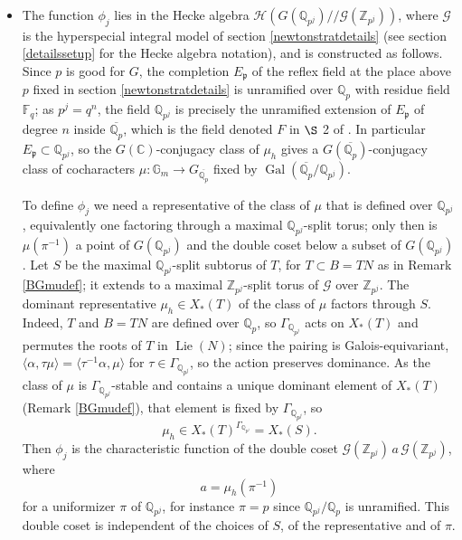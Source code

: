 \documentclass[11pt,a4paper]{article}
\theoremstyle{definition}
\theoremstyle{plain}
\theoremstyle{remark}
\theoremstyle{plain}
\DeclareMathOperator{\Lie}{Lie}
\DeclareMathOperator{\Gal}{Gal}
\begin{document}
\begin{itemize}
    \item The function $\phi_j$ lies in the Hecke algebra $\mathcal{H}(G(\mathbb{Q}_{p^j})//\mathcal{G}(\mathbb{Z}_{p^j}))$, where $\mathcal{G}$ is the hyperspecial integral model of section \ref{newtonstratdetails} (see section \ref{detailssetup} for the Hecke algebra notation), and is constructed as follows. Since $p$ is good for $G$, the completion $E_{\mathfrak{p}}$ of the reflex field at the place above $p$ fixed in section \ref{newtonstratdetails} is unramified over $\mathbb{Q}_p$ with residue field $\mathbb{F}_q$; as $p^j = q^n$, the field $\mathbb{Q}_{p^j}$ is precisely the unramified extension of $E_{\mathfrak{p}}$ of degree $n$ inside $\overline{\mathbb{Q}_p}$, which is the field denoted $F$ in $\S$ 2 of \cite{MR1044820}. In particular $E_{\mathfrak{p}} \subset \mathbb{Q}_{p^j}$, so the $G(\mathbb{C})$-conjugacy class of $\mu_h$ gives a $G(\overline{\mathbb{Q}_p})$-conjugacy class of cocharacters $\mu : \mathbb{G}_m \xrightarrow[]{} G_{\overline{\mathbb{Q}_p}}$ fixed by $\Gal(\overline{\mathbb{Q}_p}/\mathbb{Q}_{p^j})$.

    To define $\phi_j$ we need a representative of the class of $\mu$ that is defined over
    $\mathbb{Q}_{p^j}$, equivalently one factoring through a maximal $\mathbb{Q}_{p^j}$-split
    torus; only then is $\mu(\pi^{-1})$ a point of $G(\mathbb{Q}_{p^j})$ and the double coset
    below a subset of $G(\mathbb{Q}_{p^j})$. Let $S$ be the maximal $\mathbb{Q}_{p^j}$-split subtorus of $T$, for $T \subset B = TN$ as in Remark \ref{BGmudef}; it extends to a maximal $\mathbb{Z}_{p^j}$-split torus of $\mathcal{G}$ over $\mathbb{Z}_{p^j}$. The dominant representative $\mu_h \in X_*(T)$ of the class of $\mu$ factors through $S$. Indeed, $T$ and $B = TN$ are defined over $\mathbb{Q}_p$, so $\Gamma_{\mathbb{Q}_{p^j}}$ acts on $X_*(T)$ and permutes the roots of $T$ in $\Lie(N)$; since the pairing is Galois-equivariant, $\langle \alpha, \tau\mu \rangle = \langle \tau^{-1}\alpha, \mu \rangle$ for $\tau \in \Gamma_{\mathbb{Q}_{p^j}}$, so the action preserves dominance. As the class of $\mu$ is $\Gamma_{\mathbb{Q}_{p^j}}$-stable and contains a unique dominant element of $X_*(T)$ (Remark \ref{BGmudef}), that element is fixed by $\Gamma_{\mathbb{Q}_{p^j}}$, so
    $$\mu_h \in X_*(T)^{\Gamma_{\mathbb{Q}_{p^j}}} = X_*(S).$$
    Then $\phi_j$ is the characteristic function of the double coset $\mathcal{G}(\mathbb{Z}_{p^j}) \, a \, \mathcal{G}(\mathbb{Z}_{p^j})$, where
    $$a = \mu_h(\pi^{-1})$$
    for a uniformizer $\pi$ of $\mathbb{Q}_{p^j}$, for instance $\pi = p$ since $\mathbb{Q}_{p^j}/\mathbb{Q}_p$ is unramified. This double coset is independent of the choices of $S$, of the representative and of $\pi$.
\end{itemize}
\end{document}
